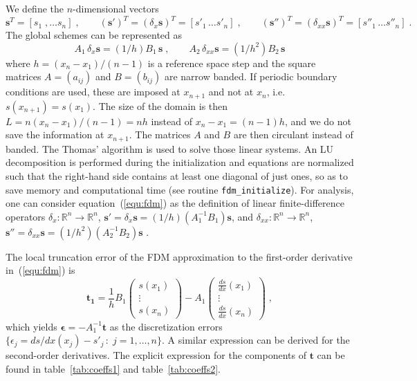 We define the $n$-dimensional vectors
\begin{equation}
  \mathbf{s}^T=[s_1\;,\ldots s_n]\;,\qquad (\mathbf{s'})^T=(\delta_x \mathbf{s})^T=[s'_1\,\ldots s'_n]\;,\qquad (\mathbf{s''})^T=(\delta_{xx} \mathbf{s})^T=[s''_1\,\ldots s''_n] \;.
\end{equation}
The global schemes can be represented as
\begin{equation}
  A_1\, \delta_x \mathbf{s}=(1/h)B_1\, \mathbf{s} \;, \qquad
  A_2\, \delta_{xx} \mathbf{s}=(1/h^2)B_2\, \mathbf{s}
\label{equ:fdm}
\end{equation}
where $h=(x_n-x_1)/(n-1)$ is a reference space step and the square matrices $A=(a_{ij})$ and $B=(b_{ij})$ are narrow banded. If periodic boundary conditions are used, these are imposed at $x_{n+1}$ and not at $x_n$, i.e.  $s(x_{n+1})=s(x_1)$. The size of the domain is then $L=n(x_n-x_1)/(n-1)=nh$ instead of $x_n-x_1=(n-1)h$, and we do not save the information at $x_{n+1}$. The matrices $A$ and $B$ are then circulant instead of banded. The Thomas' algorithm is used to solve those linear systems. An LU decomposition is performed during the initialization and equations are normalized such that the right-hand side contains at least one diagonal of just ones, so as to save memory and computational time (see routine {\tt   fdm\_initialize}). For analysis, one can consider equation~(\ref{equ:fdm}) as the definition of linear finite-difference operators $\delta_x: \mathbb{R}^n \rightarrow \mathbb{R}^n$, $\mathbf{s'} = \delta_x\mathbf{s} = (1/h)(A_1^{-1}B_1)\mathbf{s}$, and $\delta_{xx}: \mathbb{R}^n \rightarrow \mathbb{R}^n$, $\mathbf{s''} = \delta_{xx}\mathbf{s} = (1/h^2)(A_2^{-1}B_2)\mathbf{s}$ \citep{Mellado:2012}.

The local truncation error of the FDM approximation to the first-order derivative in~(\ref{equ:fdm}) is
\begin{equation}
  \mathbf{t_1}=
  \frac{1}{h}B_1\left(\begin{array}{c}s(x_1)\\\vdots\\s(x_n)\end{array}\right)-
  A_1\left(
  \begin{array}{c}\frac{ds}{dx}(x_1)\\\vdots\\\frac{ds}{dx}(x_n)
  \end{array}\right)\;,
  \label{equ:truncation1}
\end{equation}
which yields $\boldsymbol{\epsilon} = -A_1^{-1}\mathbf{t}$ as the discretization errors $\{\epsilon_j=ds/dx(x_j)-s'_j\,:\;j=1,\ldots,n\}$. A similar expression can be derived for the second-order derivatives. The explicit expression for the components of $\mathbf{t}$ can be found in table~\ref{tab:coeffs1} and table~\ref{tab:coeffs2}.

